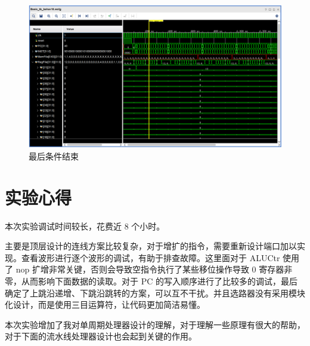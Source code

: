 \documentclass[a4paper,UTF8]{ctexart}
\begin{document}
\begin{figure}[H]
    \centering
    \includegraphics[width=\textwidth]{memdetail.png}
    \caption{最后条件结束}
    \label{fig:cond}
\end{figure}

\section{实验心得}

本次实验调试时间较长，花费近 8 个小时。

主要是顶层设计的连线方案比较复杂，对于增扩的指令，需要重新设计端口加以实现。查看波形进行逐个波形的调试，有助于排查故障。这里面对于 ALUCtr 使用了 nop 扩增非常关键，否则会导致空指令执行了某些移位操作导致 0 寄存器非零，从而影响下面数据的读取。对于 PC 的写入顺序进行了比较多的调试，最后确定了上跳沿递增、下跳沿跳转的方案，可以互不干扰。并且选路器没有采用模块化设计，而是使用三目运算符，让代码更加简洁易懂。

本次实验增加了我对单周期处理器设计的理解，对于理解一些原理有很大的帮助，对于下面的流水线处理器设计也会起到关键的作用。
\end{document}

